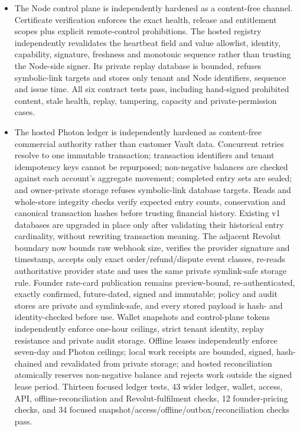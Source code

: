 \documentclass[11pt]{article}
\begin{document}
\begin{itemize}
  \item The Node control plane is independently hardened as a content-free channel. Certificate verification enforces the exact health, release and entitlement scopes plus explicit remote-control prohibitions. The hosted registry independently revalidates the heartbeat field and value allowlist, identity, capability, signature, freshness and monotonic sequence rather than trusting the Node-side signer. Its private replay database is bounded, refuses symbolic-link targets and stores only tenant and Node identifiers, sequence and issue time. All six contract tests pass, including hand-signed prohibited content, stale health, replay, tampering, capacity and private-permission cases.
  \item The hosted Photon ledger is independently hardened as content-free commercial authority rather than customer Vault data. Concurrent retries resolve to one immutable transaction; transaction identifiers and tenant idempotency keys cannot be repurposed; non-negative balances are checked against each account's aggregate movement; completed entry sets are sealed; and owner-private storage refuses symbolic-link database targets. Reads and whole-store integrity checks verify expected entry counts, conservation and canonical transaction hashes before trusting financial history. Existing v1 databases are upgraded in place only after validating their historical entry cardinality, without rewriting transaction meaning. The adjacent Revolut boundary now bounds raw webhook size, verifies the provider signature and timestamp, accepts only exact order/refund/dispute event classes, re-reads authoritative provider state and uses the same private symlink-safe storage rule. Founder rate-card publication remains preview-bound, re-authenticated, exactly confirmed, future-dated, signed and immutable; policy and audit stores are private and symlink-safe, and every stored payload is hash- and identity-checked before use. Wallet snapshots and control-plane tokens independently enforce one-hour ceilings, strict tenant identity, replay resistance and private audit storage. Offline leases independently enforce seven-day and Photon ceilings; local work receipts are bounded, signed, hash-chained and revalidated from private storage; and hosted reconciliation atomically reserves non-negative balance and rejects work outside the signed lease period. Thirteen focused ledger tests, 43 wider ledger, wallet, access, API, offline-reconciliation and Revolut-fulfilment checks, 12 founder-pricing checks, and 34 focused snapshot/access/offline/outbox/reconciliation checks pass.

\end{itemize}
\end{document}
